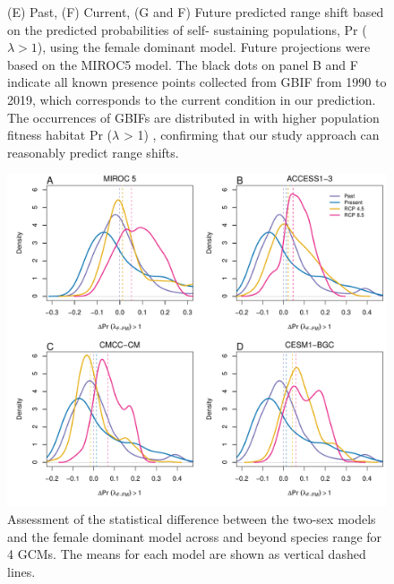 \documentclass[12pt]{article}\usepackage[]{graphicx}\usepackage[dvipsnames]{xcolor}
\begin{document}
\begin{figure}[H]
\begin{center}
{			(E) Past, (F) Current, (G and F) Future  predicted range shift based on the predicted probabilities of self- sustaining populations, Pr ($\lambda > 1$), using the female dominant model.
			Future projections were based on the MIROC5 model.
			The black dots on panel B and F indicate all known presence points collected from GBIF from 1990 to 2019, which corresponds to the current condition in our prediction. 
			The occurrences of GBIFs are distributed in with higher population fitness habitat Pr ($\lambda$ > 1) , confirming that our study approach can reasonably predict range shifts.}
		\label{Sup:geoprojmiroc}
	\end{center}
\end{figure}

\begin{figure}[H]
	\begin{center}
		\includegraphics[width=0.99\linewidth]{Figures/Densityplot_lambda_GCMs.pdf}
		\caption{ Assessment of the statistical difference between the two-sex models and the female dominant model across and beyond species range for 4 GCMs. 
			The means for each model are shown as vertical dashed lines. }
		\label{Sup:geo_overestimation}
	\end{center}
\end{figure}
\end{document}
